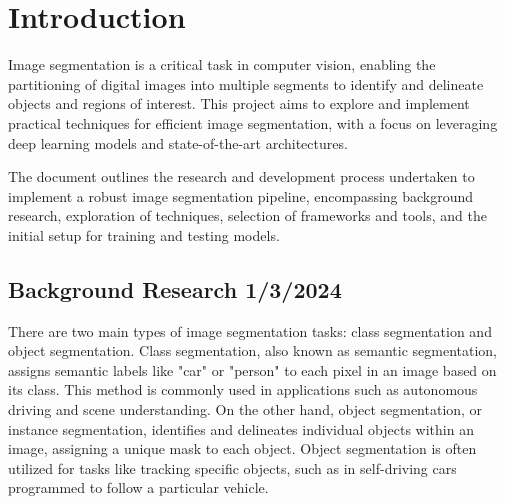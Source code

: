 \chapter{Introduction}\label{ch:intro}
 \setcounter{page}{1}


Image segmentation is a critical task in computer vision, enabling the partitioning of digital images into multiple segments to identify and delineate objects and regions of interest. This project aims to explore and implement practical techniques for efficient image segmentation, with a focus on leveraging deep learning models and state-of-the-art architectures.

The document outlines the research and development process undertaken to implement a robust image segmentation pipeline, encompassing background research, exploration of techniques, selection of frameworks and tools, and the initial setup for training and testing models.

\section{Background Research 1/3/2024}
There are two main types of image segmentation tasks: class segmentation and object segmentation. Class segmentation, also known as semantic segmentation, assigns semantic labels like "car" or "person" to each pixel in an image based on its class. This method is commonly used in applications such as autonomous driving and scene understanding. On the other hand, object segmentation, or instance segmentation, identifies and delineates individual objects within an image, assigning a unique mask to each object. Object segmentation is often utilized for tasks like tracking specific objects, such as in self-driving cars programmed to follow a particular vehicle.

